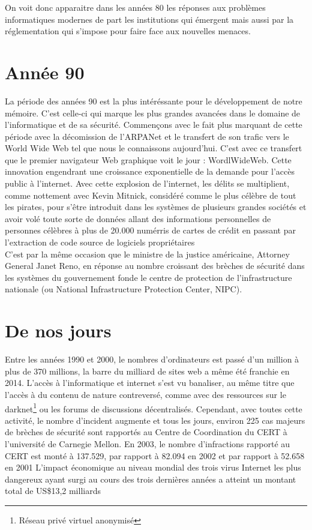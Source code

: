\documentclass[a4paper]{memoir}
\begin{document}
On voit donc apparaitre dans les années 80 les réponses aux problèmes informatiques modernes de part les institutions qui émergent mais aussi par la réglementation qui s'impose pour faire face aux nouvelles menaces.

\section{Année 90}

La période des années 90 est la plus intéréssante pour le développement de notre mémoire. C'est celle-ci qui marque les plus grandes avancées dans le domaine de l'informatique et de sa sécurité.
Commençons avec le fait plus marquant de cette période avec la décomission de l'ARPANet et le transfert de son trafic vers le World Wide Web tel que nous le connaissons aujourd'hui. C'est avec ce transfert que le premier navigateur Web graphique voit le jour : WordlWideWeb. Cette innovation engendrant une croissance exponentielle de la demande pour l'accès public à l'internet. Avec cette explosion de l'internet, les délits se multiplient, comme nottement avec Kevin Mitnick, considéré comme le plus célèbre de tout les pirates, pour s'être introduit dans les systèmes de plusieurs grandes sociétés et avoir volé toute sorte de données allant des informations personnelles de personnes célèbres à plus de 20.000 numérris de cartes de crédit en passant par l'extraction de code source de logiciels propriétaires \\
\noindent C'est par la même occasion que le ministre de la justice américaine, Attorney General Janet Reno, en réponse au nombre croissant des brèches de sécurité dans les systèmes du gouvernement fonde le centre de protection de l'infrastructure nationale (ou National Infrastructure Protection Center, NIPC).


\section{De nos jours}

Entre les années 1990 et 2000, le nombres d'ordinateurs est passé d'un million à plus de 370 millions, la barre du milliard de sites web a même été franchie en 2014. L'accès à l'informatique et internet s'est vu banaliser, au même titre que l'accès à du contenu de nature contreversé, comme avec des ressources sur le darknet\footnote{Réseau privé virtuel anonymisé} ou les forums de discussions décentralisés.
Cependant, avec toutes cette activité, le nombre d'incident augmente et tous les jours, environ 225 cas majeurs de brèches de sécurité sont rapportés au Centre de Coordination du CERT à l'université de Carnegie Mellon.
En 2003, le nombre d'infractions rapporté au CERT est monté à 137.529, par rapport à 82.094 en 2002 et par rapport à 52.658 en 2001
L'impact économique au niveau mondial des trois virus Internet les plus dangereux ayant surgi au cours des trois dernières années a atteint un montant total de US\$13,2 milliards\\
\end{document}

